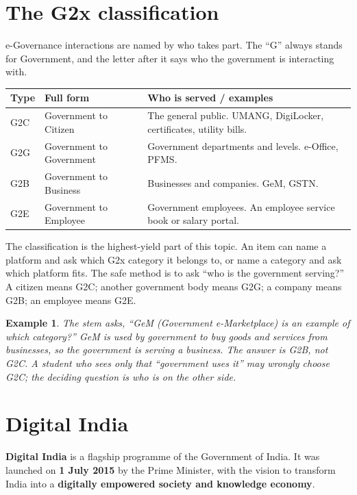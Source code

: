 \documentclass[11pt]{article}
\newtheorem{example}{Example}[section]
\begin{document}
\section{The G2x classification}
e-Governance interactions are named by who takes part. The ``G'' always
stands for Government, and the letter after it says who the government is
interacting with.

\begin{center}
\begin{tabular}{p{}p{}p{}}
\toprule
\textbf{Type} & \textbf{Full form} & \textbf{Who is served / examples} \\
\midrule
G2C & Government to Citizen & The general public. UMANG, DigiLocker, certificates, utility bills. \\
G2G & Government to Government & Government departments and levels. e-Office, PFMS. \\
G2B & Government to Business & Businesses and companies. GeM, GSTN. \\
G2E & Government to Employee & Government employees. An employee service book or salary portal. \\
\bottomrule
\end{tabular}
\end{center}

The classification is the highest-yield part of this topic. An item can
name a platform and ask which G2x category it belongs to, or name a category
and ask which platform fits. The safe method is to ask ``who is the
government serving?'' A citizen means G2C; another government body means
G2G; a company means G2B; an employee means G2E.

\begin{example}
The stem asks, ``GeM (Government e-Marketplace) is an example of which
category?'' GeM is used by government to buy goods and services from
businesses, so the government is serving a business. The answer is G2B, not
G2C. A student who sees only that ``government uses it'' may wrongly choose
G2C; the deciding question is who is on the other side.
\end{example}

\section{Digital India}
\textbf{Digital India} is a flagship programme of the Government of India.
It was launched on \textbf{1 July 2015} by the Prime Minister, with the
vision to transform India into a \textbf{digitally empowered society and
knowledge economy}.
\end{document}
